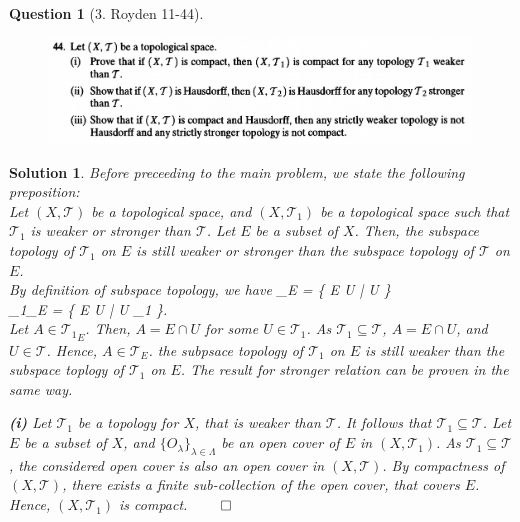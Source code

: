 \documentclass{article} %
\def\eQb#1\eQe{\begin{eqnarray*}#1\end{eqnarray*}}
\theoremstyle{quest}
\newtheorem*{question}{Question}
\newtheorem*{solution}{Solution}
\begin{document}
\begin{question}[3. Royden 11-44]
\hfill
\begin{figure}[h!]
  \centering
    \includegraphics[width=1\textwidth]{11-44}
\end{figure}
\end{question}
\begin{solution} 
Before preceeding to the main problem, we state the following preposition: \\ 
Let $(X,\mathscr{T})$ be a topological space, and $(X,\mathscr{T}_1)$ be
a topological space such that $\mathscr{T}_1$ is weaker or stronger
than $\mathscr{T}$.
Let $E$ be a subset of $X$. Then, the subspace topology of
$\mathscr{T}_1$ on $E$ is still weaker or stronger 
than the subspace topology of $\mathscr{T}$ on $E$. \\
 
By definition of subspace topology, we have
\eQb
\mathscr{T}_{E} = \{ E \cap U \> | \> U \in {} \} \\
{_{1}}_{E} = \{ E \cap U \> | \> U \in {}_1 \}. \\
\eQe 
Let $A \in {\mathscr{T}_{1}}_{E}$. Then, $A = E \cap U$ for some $U \in
\mathscr{T}_1$. As $\mathscr{T}_1 \subseteq \mathscr{T}$, $A = E \cap U$,
and $U \in \mathscr{T}$. Hence, $A \in \mathscr{T}_E$. the subpsace topology
of $\mathscr{T}_1$ on $E$ is still weaker than the subspace toplogy 
of $\mathscr{T}_1$ on $E$. The result for stronger relation can be proven
in the same way. 


\textbf{(i)} 
Let $\mathscr{T}_1$ be a topology for $X$, that is weaker than $\mathscr{T}$.
It follows that $\mathscr{T}_1 \subseteq \mathscr{T}$. Let $E$ be
a subset of $X$, and $\{O_\lambda \}_{\lambda \in \Lambda}$ be 
an open cover of $E$ in $(X,\mathscr{T}_1)$. 
As $\mathscr{T}_1 \subseteq \mathscr{T}$, 
the considered open cover is also an open cover in $(X,\mathscr{T})$. 
By compactness of $(X,\mathscr{T})$, 
there exists a finite sub-collection of the open cover, that covers $E$.
Hence, $(X,\mathscr{T}_1)$ is compact. \hfill $\qed$ 

\smallskip


\end{solution}
\end{document}
